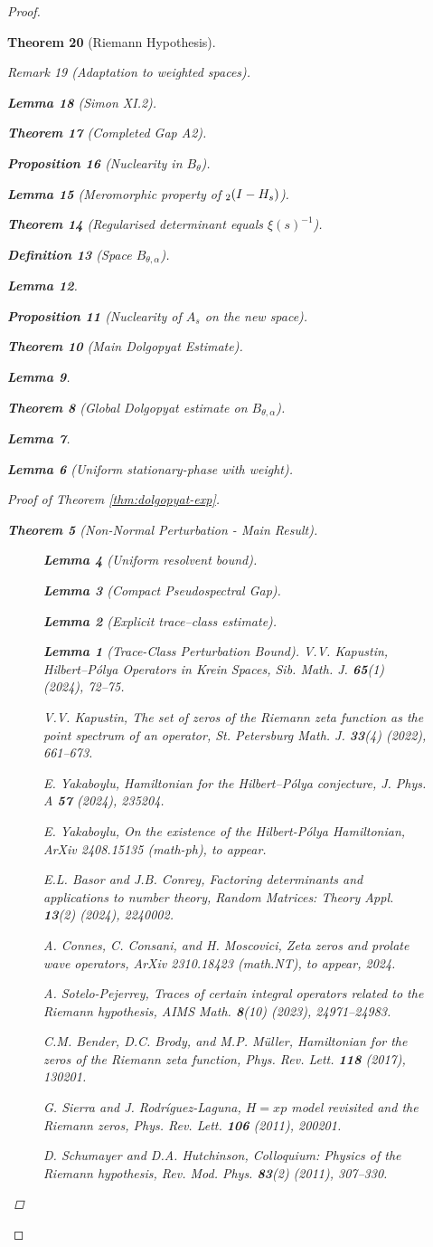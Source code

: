 \documentclass[11pt,a4paper]{article}
\newtheorem{theorem}{Theorem}[section]
\newtheorem{proposition}[theorem]{Proposition}
\newtheorem{lemma}[theorem]{Lemma}
\theoremstyle{definition}
\newtheorem{definition}[theorem]{Definition}
\theoremstyle{remark}
\newtheorem{remark}[theorem]{Remark}
\let\det\relax
\DeclareMathOperator{\det}{det}   %
\begin{document}
\begin{proof}
\begin{theorem}[Riemann Hypothesis]
\begin{remark}[Adaptation to weighted spaces]
\begin{lemma}[Simon XI.2]
\begin{theorem}[Completed Gap A2]
\begin{proposition}[Nuclearity in $B_{\theta}$]
\begin{itemize}
\begin{itemize}
\begin{lemma}[Meromorphic property of $\det_2(I-H_s)$]
\begin{theorem}[Regularised determinant equals $\xi(s)^{-1}$]
\begin{definition}[Space \(B_{\theta,\alpha}\)]
\begin{lemma}
\begin{proposition}[Nuclearity of \(A_s\) on the new space]
\begin{theorem}[Main Dolgopyat Estimate]
\begin{lemma}
\begin{theorem}[Global Dolgopyat estimate on $B_{\theta,\alpha}$]
\begin{lemma}
\begin{lemma}[Uniform stationary-phase with weight]
\begin{proof}[Proof of Theorem \ref{thm:dolgopyat-exp}]
\begin{theorem}[Non-Normal Perturbation - Main Result]
\begin{figure}[h]
\begin{lemma}[Uniform resolvent bound]
\begin{lemma}[Compact Pseudospectral Gap]
\begin{lemma}[Explicit trace–class estimate]
\begin{lemma}[Trace-Class Perturbation Bound]
V.V. Kapustin,
\emph{Hilbert–Pólya Operators in Krein Spaces},
Sib. Math. J. \textbf{65}(1) (2024), 72--75.

V.V. Kapustin,
\emph{The set of zeros of the Riemann zeta function as the point spectrum of an operator},
St. Petersburg Math. J. \textbf{33}(4) (2022), 661--673.

E. Yakaboylu,
\emph{Hamiltonian for the Hilbert–Pólya conjecture},
J. Phys. A \textbf{57} (2024), 235204.

E. Yakaboylu,
\emph{On the existence of the Hilbert-Pólya Hamiltonian},
ArXiv 2408.15135 (math-ph), to appear.

E.L. Basor and J.B. Conrey,
\emph{Factoring determinants and applications to number theory},
Random Matrices: Theory Appl. \textbf{13}(2) (2024), 2240002.

A. Connes, C. Consani, and H. Moscovici,
\emph{Zeta zeros and prolate wave operators},
ArXiv 2310.18423 (math.NT), to appear, 2024.

A. Sotelo-Pejerrey,
\emph{Traces of certain integral operators related to the Riemann hypothesis},
AIMS Math. \textbf{8}(10) (2023), 24971--24983.

C.M. Bender, D.C. Brody, and M.P. Müller,
\emph{Hamiltonian for the zeros of the Riemann zeta function},
Phys. Rev. Lett. \textbf{118} (2017), 130201.

G. Sierra and J. Rodríguez-Laguna,
\emph{$H = xp$ model revisited and the Riemann zeros},
Phys. Rev. Lett. \textbf{106} (2011), 200201.

D. Schumayer and D.A. Hutchinson,
\emph{Colloquium: Physics of the Riemann hypothesis},
Rev. Mod. Phys. \textbf{83}(2) (2011), 307--330.


\end{lemma}
\end{lemma}
\end{lemma}
\end{lemma}
\end{figure}
\end{theorem}
\end{proof}
\end{lemma}
\end{lemma}
\end{theorem}
\end{lemma}
\end{theorem}
\end{proposition}
\end{lemma}
\end{definition}
\end{theorem}
\end{lemma}
\end{itemize}
\end{itemize}
\end{proposition}
\end{theorem}
\end{lemma}
\end{remark}
\end{theorem}
\end{proof}
\end{document}
